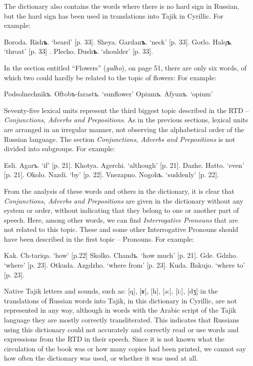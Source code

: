 \documentclass[output=paper,colorlinks,citecolor=brown,arabicfont,chinesefont]{langscibook}
\begin{document}
The dictionary also contains the words where there is no hard sign in Russian, but  the hard sign has been used in translations into Tajik in Cyrillic. For example:

\ea
    \ea Boroda. 	Rish\textbf{ъ}.
        \glt `beard' 	[p. 33].
    \ex Sheya.  	Gardan\textbf{ъ}.
        \glt `neck'  [p. 33].
    \ex Gorlo. 	Halq\textbf{ъ}.
        \glt `throat' 	[p. 33]	.
    \ex Plecho. 	Dush\textbf{ъ}.
        \glt `shoulder' 	[p. 33].
    \z
\z

In the section entitled “Flowers” (\textit{gulho}), on page 51, there are only six words, of which two  could hardly be related to the topic of flowers: For example:

\ea
    \ea Podsolnechnikъ. Oftobъ-farastъ.
    \glt `sunflower'
    \ex Opiumъ. 		Afyunъ.
    \glt `opium'
    \z
\z

Seventy-five lexical units represent the third biggest topic described in the RTD – \emph{Conjunctions, Adverbs and Prepositions}. As in the previous sections, lexical units are arranged in an irregular manner, not observing the alphabetical order of the Russian language. The section \emph{Conjunctions, Adverbs and Prepositions} is not divided into subgroups. For example:

\ea
   \ea Esli. 		Agarъ.
       \glt `if' 	 [p. 21].
   \ex Khotya. 	Agerchi.
       \glt `although'  	[p. 21].
   \ex Dazhe. 	Hatto.
       \glt `even' 	[p. 21].
   \ex Okolo. 	Nazdi.
       \glt `by'  	 [p. 22].
   \ex Vnezapno.   Nogohъ.
       \glt `suddenly'  	[p. 22].
   \z
\z

From the analysis of these  words and others in the dictionary, it is clear that \emph{Conjunctions, Adverbs and Prepositions} are given in the dictionary without any system or order, without indicating that they belong to one or another part of speech. Here, among other words, we can find \emph{Interrogative Pronouns} that are not related to this topic. These and some other Interrogative Pronouns should have been described in the first topic – Pronouns. For example:

\ea
   \ea Kak. 		Ch-tariqa.
       \glt `how'    [p.22]
   \ex Skolko. 	Chandъ.
       \glt `how much' 	 [p. 21].
   \ex Gde. 		Gdzho.
       \glt `where'  	[p. 23].
   \ex Otkuda. 	Azgdzho.
       \glt `where from'  	 [p. 23].
   \ex Kuda. 	Bakujo.
       \glt `where to'  	 [p. 23].
   \z
\z

Native Tajik letters and sounds, such as: [q], [ʁ], [h], [ə:], [i:], [dʒ] in the translations of Russian words into Tajik, in this dictionary in Cyrillic, are not represented in any way, although in words with the Arabic script of the Tajik language they are mostly correctly transliterated. This indicates that Russians using this dictionary could not accurately and correctly read or use words and expressions from the RTD in their speech. Since it is not known what the circulation of the book was or how many copies had been printed, we cannot say how often the dictionary was used, or whether it was used at all.
\end{document}

